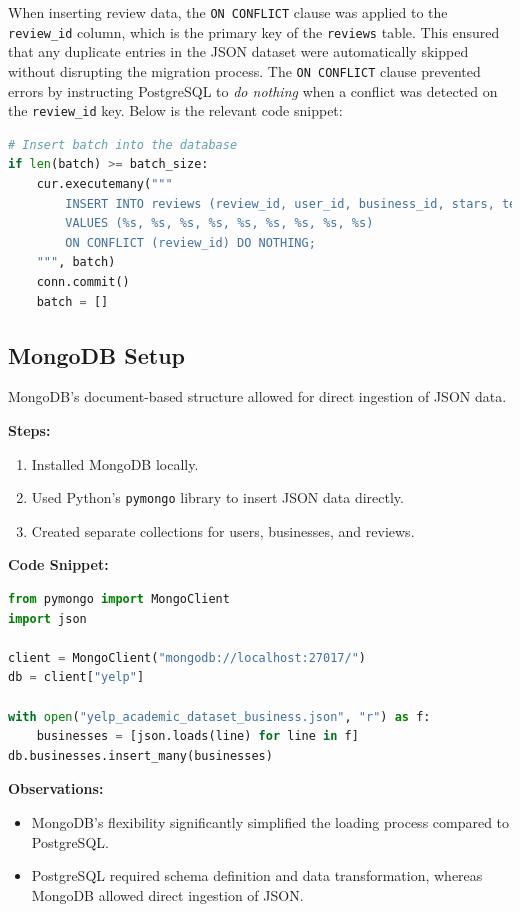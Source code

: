 \documentclass[12pt]{article}
\begin{document}
When inserting review data, the \texttt{ON CONFLICT} clause was applied to the \texttt{review\_id} column, which is the primary key of the \texttt{reviews} table. This ensured that any duplicate entries in the JSON dataset were automatically skipped without disrupting the migration process. The \texttt{ON CONFLICT} clause prevented errors by instructing PostgreSQL to \textit{do nothing} when a conflict was detected on the \texttt{review\_id} key. Below is the relevant code snippet:

\begin{lstlisting}[language=Python, caption={Batch Insert with Conflict Handling in PostgreSQL}]
# Insert batch into the database
if len(batch) >= batch_size:
    cur.executemany("""
        INSERT INTO reviews (review_id, user_id, business_id, stars, text, useful, funny, cool, date)
        VALUES (%s, %s, %s, %s, %s, %s, %s, %s, %s)
        ON CONFLICT (review_id) DO NOTHING;
    """, batch)
    conn.commit()
    batch = []
\end{lstlisting}



\subsection*{MongoDB Setup}
MongoDB's document-based structure allowed for direct ingestion of JSON data.

\textbf{Steps:}
\begin{enumerate}
    \item Installed MongoDB locally.
    \item Used Python's \texttt{pymongo} library to insert JSON data directly.
    \item Created separate collections for users, businesses, and reviews.
\end{enumerate}

\textbf{Code Snippet:}
\begin{lstlisting}[language=Python, caption=Loading Data into MongoDB]
from pymongo import MongoClient
import json

client = MongoClient("mongodb://localhost:27017/")
db = client["yelp"]

with open("yelp_academic_dataset_business.json", "r") as f:
    businesses = [json.loads(line) for line in f]
db.businesses.insert_many(businesses)
\end{lstlisting}

\textbf{Observations:}
\begin{itemize}
    \item MongoDB's flexibility significantly simplified the loading process compared to PostgreSQL.
    \item PostgreSQL required schema definition and data transformation, whereas MongoDB allowed direct ingestion of JSON.
\end{itemize}
\end{document}
